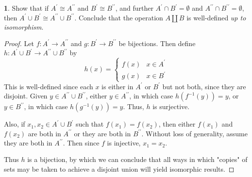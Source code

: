 \documentclass{article}
\newcounter{section-number}
\theoremstyle{definition}
\newtheorem{ex}{}[section-number]
\begin{document}
\begin{ex}
	Show that if $A^\prime \cong A^{\prime\prime}$ and $B^\prime \cong B^{\prime\prime}$, and further $A^\prime \cap B^\prime = \emptyset$ and $A^{\prime\prime} \cap B^{\prime\prime} = \emptyset$, then $A^\prime \cup B^\prime \cong A^{\prime\prime} \cup B^{\prime\prime}$.
	Conclude that the operation $A \amalg B$ is well-defined \textit{up to isomorphism}.
\end{ex}
\begin{proof}
	Let $f: A^\prime \to A^{\prime\prime}$ and $g: B^\prime \to B^{\prime\prime}$ be bijections.
	Then define $h: A^\prime \cup B^\prime \to A^{\prime\prime} \cup B^{\prime\prime}$ by \begin{equation*}
		h(x) = \begin{cases}
			f(x) & x \in A^\prime \\
			g(x) & x \in B^\prime
		\end{cases}
	\end{equation*}
	This is well-defined since each $x$ is either in $A^\prime$ or $B^\prime$ but not both, since they are disjoint.
	Given $y \in A^{\prime\prime} \cup B^{\prime\prime}$, either $y \in A^{\prime\prime}$, in which case $h(f^{-1}(y)) = y$, or $y \in B^{\prime\prime}$, in which case $h(g^{-1}(y)) = y$.
	Thus, $h$ is surjective.

	Also, if $x_1, x_2 \in A^\prime \cup B^\prime$ such that $f(x_1) = f(x_2)$, then either $f(x_1)$ and $f(x_2)$ are both in $A^{\prime\prime}$ or they are both in $B^{\prime\prime}$.
	Without loss of generality, assume they are both in $A^{\prime\prime}$.
	Then since $f$ is injective, $x_1 = x_2$.

	Thus $h$ is a bijection, by which we can conclude that all ways in which "copies" of sets may be taken to achieve a disjoint union will yield isomorphic results.
\end{proof}
\end{document}
